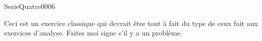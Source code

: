 
\begin{corrige}{SerieQuatre0006}

	Ceci est un exercice classique qui devrait être tout à fait du type de ceux fait aux exercices d'analyse. Faites moi signe s'il y a un problème.

\end{corrige}
